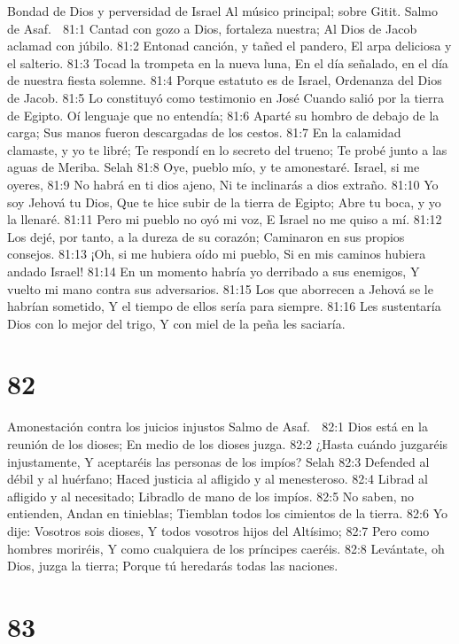 Bondad de Dios y perversidad de Israel 
Al músico principal; sobre Gitit. Salmo de Asaf. 

81:1 Cantad con gozo a Dios, fortaleza nuestra; 
Al Dios de Jacob aclamad con júbilo. 
81:2 Entonad canción, y tañed el pandero, 
El arpa deliciosa y el salterio. 
81:3 Tocad la trompeta en la nueva luna, 
En el día señalado, en el día de nuestra fiesta solemne. 
81:4 Porque estatuto es de Israel, 
Ordenanza del Dios de Jacob. 
81:5 Lo constituyó como testimonio en José 
Cuando salió por la tierra de Egipto. 
Oí lenguaje que no entendía; 
81:6 Aparté su hombro de debajo de la carga; 
Sus manos fueron descargadas de los cestos. 
81:7 En la calamidad clamaste, y yo te libré; 
Te respondí en lo secreto del trueno; 
Te probé junto a las aguas de Meriba. Selah 
81:8 Oye, pueblo mío, y te amonestaré. 
Israel, si me oyeres, 
81:9 No habrá en ti dios ajeno, 
Ni te inclinarás a dios extraño. 
81:10 Yo soy Jehová tu Dios, 
Que te hice subir de la tierra de Egipto; 
Abre tu boca, y yo la llenaré. 
81:11 Pero mi pueblo no oyó mi voz, 
E Israel no me quiso a mí. 
81:12 Los dejé, por tanto, a la dureza de su corazón; 
Caminaron en sus propios consejos. 
81:13 ¡Oh, si me hubiera oído mi pueblo, 
Si en mis caminos hubiera andado Israel! 
81:14 En un momento habría yo derribado a sus enemigos, 
Y vuelto mi mano contra sus adversarios. 
81:15 Los que aborrecen a Jehová se le habrían sometido, 
Y el tiempo de ellos sería para siempre. 
81:16 Les sustentaría Dios con lo mejor del trigo, 
Y con miel de la peña les saciaría. 

\chapter{82}

Amonestación contra los juicios injustos 
Salmo de Asaf. 

82:1 Dios está en la reunión de los dioses; 
En medio de los dioses juzga. 
82:2 ¿Hasta cuándo juzgaréis injustamente, 
Y aceptaréis las personas de los impíos? Selah 
82:3 Defended al débil y al huérfano; 
Haced justicia al afligido y al menesteroso. 
82:4 Librad al afligido y al necesitado; 
Libradlo de mano de los impíos. 
82:5 No saben, no entienden, 
Andan en tinieblas; 
Tiemblan todos los cimientos de la tierra. 
82:6 Yo dije: Vosotros sois dioses, 
Y todos vosotros hijos del Altísimo; 
82:7 Pero como hombres moriréis, 
Y como cualquiera de los príncipes caeréis. 
82:8 Levántate, oh Dios, juzga la tierra; 
Porque tú heredarás todas las naciones. 

\chapter{83}

